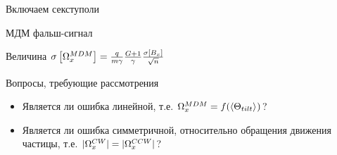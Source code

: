 \documentclass[14pt]{beamer}
\begin{document}
\begin{frame}{Включаем секступоли}
\end{frame}
\begin{frame}{МДМ фальш-сигнал}
	\begin{block}{Величина}
		$\SD{\W_x^{MDM}} = \frac{q}{m\gamma}\frac{G+1}{\gamma}\frac{\SD{B_x}}{\sqrt{n}}$
	\end{block}
	\begin{block}{Вопросы, требующие рассмотрения}
		\begin{itemize}
			\item Является ли ошибка линейной, т.е. $\W_x^{MDM} = f(\avg{\Theta_{tilt}})$?
			\item Является ли ошибка симметричной, относительно обращения движения частицы, т.е. $|\Omega_x^{CW}| = |\Omega_x^{CCW}|$?
		\end{itemize}
	\end{block}
\end{frame}
\end{document}
